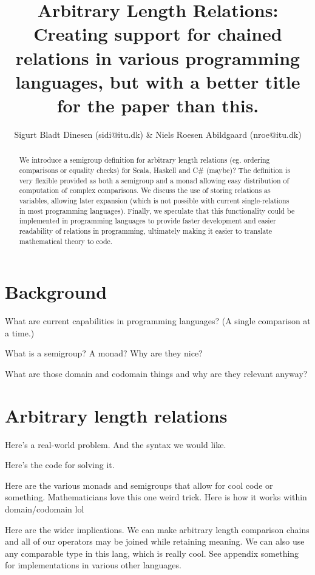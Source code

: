 \documentclass{article}
\begin{document}
\title{Arbitrary Length Relations: Creating support for chained relations in various programming languages, but with a better title for the paper than this.}
\author{Sigurt Bladt Dinesen (sidi@itu.dk) \& Niels Roesen Abildgaard (nroe@itu.dk)}
\maketitle

\begin{abstract}
We introduce a semigroup definition for arbitrary length relations (eg. ordering comparisons or equality checks) for Scala, Haskell and C\# (maybe)?
The definition is very flexible provided as both a semigroup and a monad allowing easy distribution of computation of complex comparisons.
We discuss the use of storing relations as variables, allowing later expansion (which is not possible with current single-relations in most programming languages).
Finally, we speculate that this functionality could be implemented in programming languages to provide faster development and easier readability of relations in programming, ultimately making it easier to translate mathematical theory to code.
\end{abstract}

\section{Background}
What are current capabilities in programming languages? (A single comparison at a time.)

What is a semigroup? A monad? Why are they nice?

What are those domain and codomain things and why are they relevant anyway?

\section{Arbitrary length relations}
Here's a real-world problem. And the syntax we would like.

Here's the code for solving it.

Here are the various monads and semigroups that allow for cool code or something. Mathematicians love this one weird trick. Here is how it works within domain/codomain lol

Here are the wider implications.
We can make arbitrary length comparison chains and all of our operators may be joined while retaining meaning.
We can also use any comparable type in this lang, which is really cool.
See appendix something for implementations in various other languages.
\end{document}

